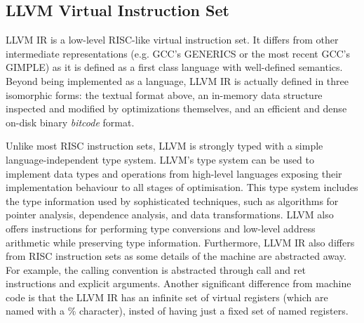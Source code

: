 
\subsection{LLVM Virtual Instruction Set}

LLVM IR is a low-level RISC-like virtual instruction set.
It differs from other intermediate representations (e.g. GCC's GENERICS or the most recent GCC's GIMPLE) as it is defined as a first class language with well-defined semantics.
Beyond being implemented as a language, LLVM IR is actually defined in three isomorphic forms: the textual format above, an in-memory data structure inspected and modified by optimizations themselves, and an efficient and dense on-disk binary \textit{bitcode} format.

Unlike most RISC instruction sets, LLVM is strongly typed with a simple language-independent type system.
LLVM's type system can be used to implement data types and operations from high-level languages exposing their implementation behaviour to all stages of optimisation.
This type system includes the type information used by sophisticated techniques, such as algorithms for pointer analysis, dependence analysis, and data transformations.
LLVM also offers instructions for performing type conversions and low-level address arithmetic while preserving type information.
Furthermore, LLVM IR also differs from RISC instruction sets as some details of the machine are abstracted away.
For example, the calling convention is abstracted through call and ret instructions and explicit arguments.
Another significant difference from machine code is that the LLVM IR has an infinite set of virtual registers (which are named with a \% character), insted of having just a fixed set of named registers.

